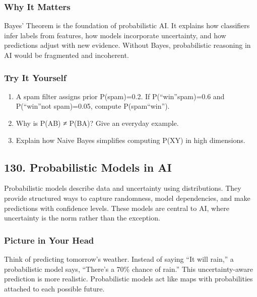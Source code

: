 \documentclass[
  letterpaper,
  DIV=11,
  numbers=noendperiod]{scrreprt}
\providecommand{\tightlist}{%
  \setlength{\itemsep}{0pt}\setlength{\parskip}{0pt}}
\begin{document}
\subsubsection{Why It Matters}\label{why-it-matters-26}

Bayes' Theorem is the foundation of probabilistic AI. It explains how
classifiers infer labels from features, how models incorporate
uncertainty, and how predictions adjust with new evidence. Without
Bayes, probabilistic reasoning in AI would be fragmented and incoherent.

\subsubsection{Try It Yourself}\label{try-it-yourself-128}

\begin{enumerate}
\def\labelenumi{\arabic{enumi}.}
\tightlist
\item
  A spam filter assigns prior P(spam)=0.2. If
  P(``win''\textbar spam)=0.6 and P(``win''\textbar not spam)=0.05,
  compute P(spam\textbar{}``win'').
\item
  Why is P(A\textbar B) ≠ P(B\textbar A)? Give an everyday example.
\item
  Explain how Naive Bayes simplifies computing P(X\textbar Y) in high
  dimensions.
\end{enumerate}

\subsection{130. Probabilistic Models in
AI}\label{probabilistic-models-in-ai}

Probabilistic models describe data and uncertainty using distributions.
They provide structured ways to capture randomness, model dependencies,
and make predictions with confidence levels. These models are central to
AI, where uncertainty is the norm rather than the exception.

\subsubsection{Picture in Your Head}\label{picture-in-your-head-129}

Think of predicting tomorrow's weather. Instead of saying ``It will
rain,'' a probabilistic model says, ``There's a 70\% chance of rain.''
This uncertainty-aware prediction is more realistic. Probabilistic
models act like maps with probabilities attached to each possible
future.
\end{document}
